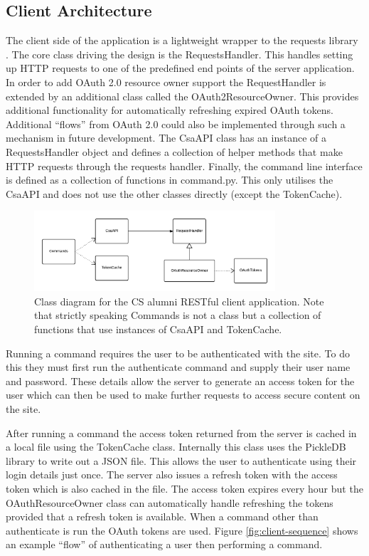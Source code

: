 \documentclass[paper=a4, fontsize=11pt]{scrartcl}	%
\numberwithin{equation}{section}															%
\numberwithin{figure}{section}																%
\numberwithin{table}{section}
\begin{document}
\subsection{Client Architecture}
\label{subsec:client-architecture}
The client side of the application is a lightweight wrapper to the requests library \citep{libraryRequests}. The core class driving the design is the RequestsHandler. This handles setting up HTTP requests to one of the predefined end points of the server application. In order to add OAuth 2.0 resource owner support the RequestHandler is extended by an additional class called the OAuth2ResourceOwner. This provides additional functionality for automatically refreshing expired OAuth tokens. Additional ``flows'' from OAuth 2.0 could also be implemented through such a mechanism in future development. The CsaAPI class has an instance of a RequestsHandler object and defines a collection of helper methods that make HTTP requests through the requests handler. Finally, the command line interface is defined as a collection of functions in command.py. This only utilises the CsaAPI and does not use the other classes directly (except the TokenCache).

\begin{figure}[H]
\centering
\includegraphics[width=0.8\textwidth]{img/client_class_diagram.png}
\caption{Class diagram for the CS alumni RESTful client application. Note that strictly speaking Commands is not a class but a collection of functions that use instances of CsaAPI and TokenCache.}
\label{fig:client-class-diagram}
\end{figure}

Running a command requires the user to be authenticated with the site. To do this they must first run the authenticate command and supply their user name and password. These details allow the server to generate an access token for the user which can then be used to make further requests to access secure content on the site.

After running a command the access token returned from the server is cached in a local file using the TokenCache class. Internally this class uses the PickleDB library \cite{libraryPickledb} to write out a JSON file. This allows the user to authenticate using their login details just once. The server also issues a refresh token with the access token which is also cached in the file. The access token expires every hour but the OAuthResourceOwner class can automatically handle refreshing the tokens provided that a refresh token is available. When a command other than authenticate is run the OAuth tokens are used. Figure \ref{fig:client-sequence} shows an example ``flow'' of authenticating a user then performing a command.
\end{document}
